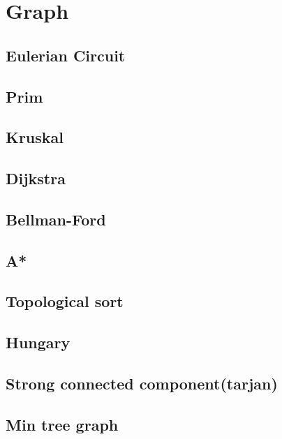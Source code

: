 \newpage
\section{Graph}

\subsection{Eulerian Circuit}


\subsection{Prim}


\subsection{Kruskal}


\subsection{Dijkstra}


\subsection{Bellman-Ford}


\subsection{A*}
\subsection{Topological sort}


\subsection{Hungary}


\subsection{Strong connected component(tarjan)}


\subsection{Min tree graph}
